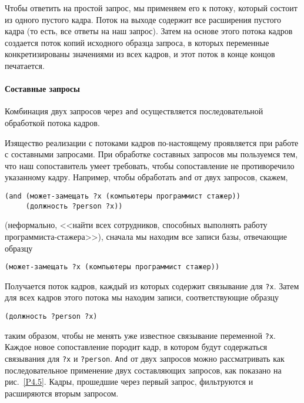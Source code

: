 Чтобы 
ответить на простой запрос, мы применяем его к
потоку, который состоит из одного пустого кадра.  Поток на выходе
содержит все расширения пустого кадра (то есть, все ответы на наш
запрос).  Затем на основе этого потока кадров создается поток
копий исходного образца запроса, в которых переменные конкретизированы
значениями из всех кадров, и этот поток в конце концов
печатается.

\paragraph{Составные запросы}

\begin{cntrfig}

\caption{Комбинация двух запросов через {\tt and}
осуществляется 
последовательной обработкой потока кадров.}
\label{P4.5}%

\end{cntrfig}

Изящество реализации с потоками кадров по-настоящему
проявляется при работе с составными запросами.  При обработке 
составных запросов мы пользуемся тем, что наш сопоставитель умеет
требовать, чтобы сопоставление не противоречило указанному кадру.
Например, чтобы обработать {\tt and} от двух запросов, скажем,

\begin{Verbatim}[fontsize=\small]
(and (может-замещать ?x (компьютеры программист стажер))
     (должность ?person ?x))
\end{Verbatim}
(неформально, <<найти всех сотрудников, способных выполнять
работу про\-грам\-мис\-та-стажера>>), сначала мы находим все записи базы,
отвечающие образцу

\begin{Verbatim}[fontsize=\small]
(может-замещать ?x (компьютеры программист стажер))
\end{Verbatim}
Получается поток кадров, каждый из которых содержит связывание для
{\tt ?x}.  Затем для всех кадров этого потока мы находим
записи, соответствующие образцу

\begin{Verbatim}[fontsize=\small]
(должность ?person ?x)
\end{Verbatim}
таким образом, чтобы не менять уже известное связывание переменной
{\tt ?x}.  Каждое новое сопоставление породит кадр, в котором
будут содержаться связывания для {\tt ?x} и
{\tt ?person}. {\tt And} от двух запросов можно
рассматривать как последовательное применение двух составляющих запросов,
как показано на рис.~\ref{P4.5}.  Кадры, прошедшие через
первый запрос, фильтруются и расширяются вторым запросом.


